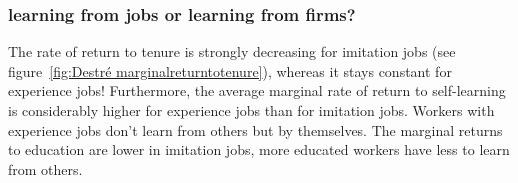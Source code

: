 \documentclass[12pt,a4paper]{article}
\begin{document}
  \subsubsection{learning from jobs or learning from firms?} %
  \label{ssub:learning from jobs or learning from firms?}
  The rate of return to tenure is strongly decreasing for imitation jobs (see figure~\ref{fig:Destré marginalreturntotenure}),
  whereas it stays constant for experience jobs! Furthermore, the average marginal rate of return to
  self-learning is considerably higher for experience jobs than for imitation jobs. Workers with
  experience jobs don't learn from others but by themselves. The marginal returns to education are
  lower in imitation jobs, more educated workers have less to learn from others.
\end{document}
